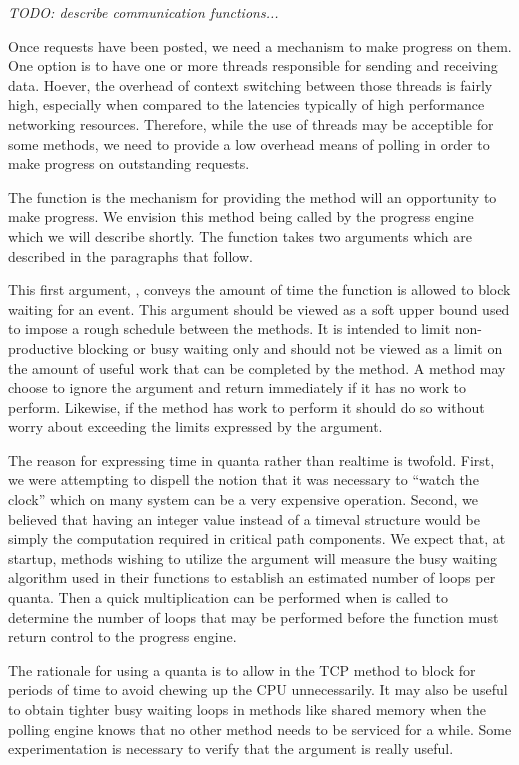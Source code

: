 \emph{TODO: describe communication functions...}

Once requests have been posted, we need a mechanism to make progress on them.
One option is to have one or more threads responsible for sending and receiving
data.  Hoever, the overhead of context switching between those threads is
fairly high, especially when compared to the latencies typically of high
performance networking resources.  Therefore, while the use of threads may be
acceptible for some methods, we need to provide a low overhead means of polling
in order to make progress on outstanding requests.

The  function is the mechanism for providing the method will
an opportunity to make progress.  We envision this method being called by the
progress engine which we will describe shortly.  The  function takes
two arguments which are described in the paragraphs that follow.

This first argument, , conveys the amount of time the function is
allowed to block waiting for an event.  This argument should be viewed as a
soft upper bound used to impose a rough schedule between the methods.  It is
intended to limit non-productive blocking or busy waiting only and should not
be viewed as a limit on the amount of useful work that can be completed by the
method.  A method may choose to ignore the argument and return immediately if
it has no work to perform.  Likewise, if the method has work to perform it
should do so without worry about exceeding the limits expressed by the
 argument.

The reason for expressing time in quanta rather than realtime is twofold.
First, we were attempting to dispell the notion that it was necessary to
``watch the clock'' which on many system can be a very expensive operation.
Second, we believed that having an integer value instead of a timeval structure
would be simply the computation required in critical path components.  We
expect that, at startup, methods wishing to utilize the  argument
will measure the busy waiting algorithm used in their  functions to
establish an estimated number of loops per quanta.  Then a quick multiplication
can be performed when  is called to determine the number of loops
that may be performed before the  function must return control to
the progress engine.

\begin{cmt}
  The rationale for using a quanta is to allow  in the TCP
  method to block for periods of time to avoid chewing up the CPU
  unnecessarily.  It may also be useful to obtain tighter busy waiting loops in
  methods like shared memory when the polling engine knows that no other method
  needs to be serviced for a while.  Some experimentation is necessary to
  verify that the  argument is really useful.
\end{cmt}

